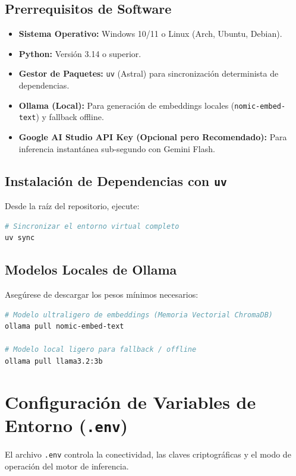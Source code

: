 \documentclass[11pt,a4paper]{article}
\begin{document}
\subsection{Prerrequisitos de Software}
\begin{itemize}
    \item \textbf{Sistema Operativo:} Windows 10/11 o Linux (Arch, Ubuntu, Debian).
    \item \textbf{Python:} Versión 3.14 o superior.
    \item \textbf{Gestor de Paquetes:} \texttt{uv} (Astral) para sincronización determinista de dependencias.
    \item \textbf{Ollama (Local):} Para generación de embeddings locales (\texttt{nomic-embed-text}) y fallback offline.
    \item \textbf{Google AI Studio API Key (Opcional pero Recomendado):} Para inferencia instantánea sub-segundo con Gemini Flash.
\end{itemize}

\subsection{Instalación de Dependencias con \texttt{uv}}
Desde la raíz del repositorio, ejecute:
\begin{lstlisting}[language=bash]
# Sincronizar el entorno virtual completo
uv sync
\end{lstlisting}

\subsection{Modelos Locales de Ollama}
Asegúrese de descargar los pesos mínimos necesarios:
\begin{lstlisting}[language=bash]
# Modelo ultraligero de embeddings (Memoria Vectorial ChromaDB)
ollama pull nomic-embed-text

# Modelo local ligero para fallback / offline
ollama pull llama3.2:3b
\end{lstlisting}

\section{Configuración de Variables de Entorno (\texttt{.env})}

El archivo \texttt{.env} controla la conectividad, las claves criptográficas y el modo de operación del motor de inferencia.
\end{document}
